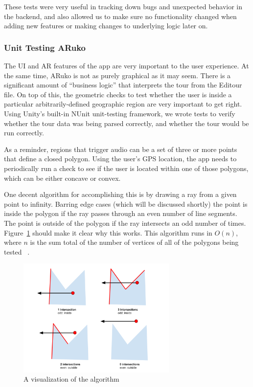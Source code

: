 \documentclass[a4paper, 10pt, american, titlepage]{article}
\begin{document}
These tests were very useful in tracking down bugs and unexpected behavior in
the backend, and also allowed us to make sure no functionality changed when
adding new features or making changes to underlying logic later on.

\subsubsection{Unit Testing ARuko}
\label{sec:unitTestingARuko}

The UI and AR features of the app are very important to the user experience. At
the same time, ARuko is not as purely graphical as it may seem. There is a
significant amount of ``business logic'' that interprets the tour from the
Editour file. On top of this, the geometric checks to test whether the user is
inside a particular arbitrarily-defined geographic region are very important to
get right.  Using Unity's built-in NUnit unit-testing framework, we wrote tests
to verify whether the tour data was being parsed correctly, and whether the tour
would be run correctly.

As a reminder, regions that trigger audio can be a set of three or more points
that define a closed polygon. Using the user's GPS location, the app needs to
periodically run a check to see if the user is located within one of those
polygons, which can be either concave or convex.

One decent algorithm for accomplishing this is by drawing a ray from a given
point to infinity. Barring edge cases (which will be discussed shortly) the
point is inside the polygon if the ray passes through an even number of line
segments.  The point is outside of the polygon if the ray intersects an odd
number of times. Figure~\ref{fig:intersectionsDiagram} should make it clear why
this works. This algorithm runs in $O(n)$, where $n$ is the sum total of the
number of vertices of all of the polygons being tested
~\autocite{geeksforgeekspolygon}.

\begin{figure}[h]
	\centering
	\includegraphics[width=0.7\textwidth]{intersections-diagram.png}
	\caption{A visualization of the algorithm}
	\label{fig:intersectionsDiagram}
\end{figure}
\end{document}
